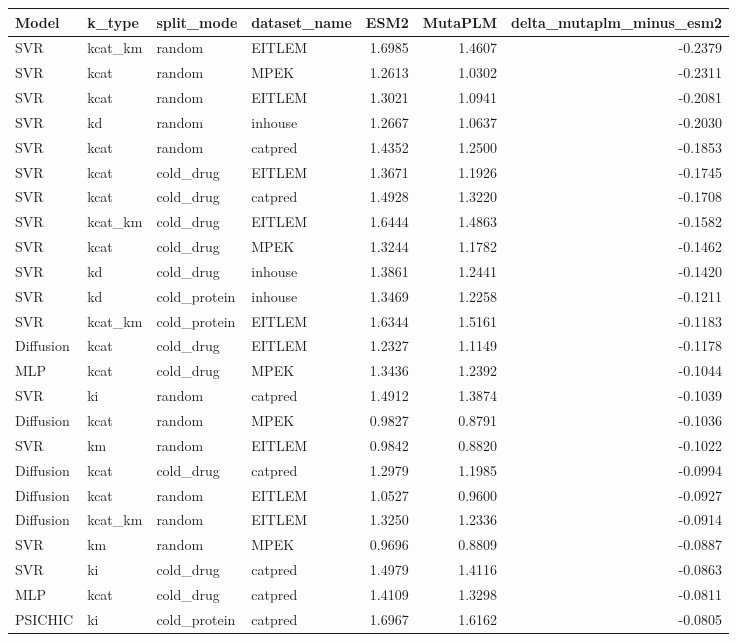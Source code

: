 \begin{tabular}{llllrrr}
\toprule
Model & k_type & split_mode & dataset_name & ESM2 & MutaPLM & delta_mutaplm_minus_esm2 \\
\midrule
SVR & kcat_km & random & EITLEM & 1.6985 & 1.4607 & -0.2379 \\
SVR & kcat & random & MPEK & 1.2613 & 1.0302 & -0.2311 \\
SVR & kcat & random & EITLEM & 1.3021 & 1.0941 & -0.2081 \\
SVR & kd & random & inhouse & 1.2667 & 1.0637 & -0.2030 \\
SVR & kcat & random & catpred & 1.4352 & 1.2500 & -0.1853 \\
SVR & kcat & cold_drug & EITLEM & 1.3671 & 1.1926 & -0.1745 \\
SVR & kcat & cold_drug & catpred & 1.4928 & 1.3220 & -0.1708 \\
SVR & kcat_km & cold_drug & EITLEM & 1.6444 & 1.4863 & -0.1582 \\
SVR & kcat & cold_drug & MPEK & 1.3244 & 1.1782 & -0.1462 \\
SVR & kd & cold_drug & inhouse & 1.3861 & 1.2441 & -0.1420 \\
SVR & kd & cold_protein & inhouse & 1.3469 & 1.2258 & -0.1211 \\
SVR & kcat_km & cold_protein & EITLEM & 1.6344 & 1.5161 & -0.1183 \\
Diffusion & kcat & cold_drug & EITLEM & 1.2327 & 1.1149 & -0.1178 \\
MLP & kcat & cold_drug & MPEK & 1.3436 & 1.2392 & -0.1044 \\
SVR & ki & random & catpred & 1.4912 & 1.3874 & -0.1039 \\
Diffusion & kcat & random & MPEK & 0.9827 & 0.8791 & -0.1036 \\
SVR & km & random & EITLEM & 0.9842 & 0.8820 & -0.1022 \\
Diffusion & kcat & cold_drug & catpred & 1.2979 & 1.1985 & -0.0994 \\
Diffusion & kcat & random & EITLEM & 1.0527 & 0.9600 & -0.0927 \\
Diffusion & kcat_km & random & EITLEM & 1.3250 & 1.2336 & -0.0914 \\
SVR & km & random & MPEK & 0.9696 & 0.8809 & -0.0887 \\
SVR & ki & cold_drug & catpred & 1.4979 & 1.4116 & -0.0863 \\
MLP & kcat & cold_drug & catpred & 1.4109 & 1.3298 & -0.0811 \\
PSICHIC & ki & cold_protein & catpred & 1.6967 & 1.6162 & -0.0805 \\

\end{tabular}
